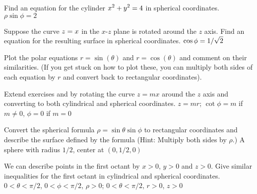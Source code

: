 \exercise Find an equation for the cylinder $\displaystyle x^2+y^2=4$ in
spherical coordinates.
\answer $\rho\sin\phi=2$
\endanswer
\endexercise

\exercise Suppose the curve $\displaystyle z=x$ in the $x$-$z$ plane is
rotated around the $z$ axis. Find an equation for the resulting
surface in spherical coordinates.
\answer $\displaystyle \cos\phi=1/\sqrt2$
\endanswer
{}
\endexercise

\exercise Plot the polar equations $r=\sin(\theta)$ and $r=\cos(\theta)$
and comment on their similarities.  (If you get stuck on how to plot
these, you can multiply both sides of each equation by $r$ and convert
back to rectangular coordinates).
\endexercise

\exercise Extend exercises  
and 
 by rotating the curve $z=mx$
around the $z$ axis and converting to both cylindrical and spherical
coordinates.
\answer $z=mr$; $\cot\phi=m$ if $m\neq0$, $\phi=0$ if $m=0$
\endanswer
\endexercise

\exercise Convert the spherical formula $\rho=\sin \theta \sin \phi$ to
rectangular coordinates and describe the surface defined by the
formula (Hint: Multiply both sides by $\rho$.)
\answer A sphere with radius $1/2$, center at $(0,1/2,0)$
\endanswer
\endexercise

\exercise We can describe points in the first octant by $x >0$, $y>0$ and
$z>0$.  Give similar inequalities for the first octant in cylindrical
and spherical coordinates.
\answer $0<\theta<\pi/2$, $0<\phi<\pi/2$, $\rho>0$;
$0<\theta<\pi/2$, $r>0$, $z>0$
\endanswer
\endexercise

\endexercises
